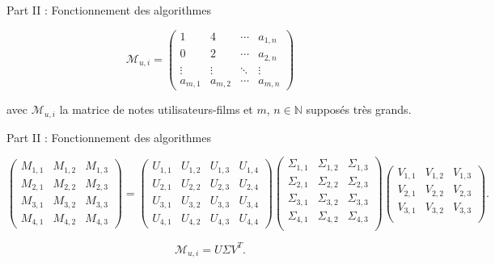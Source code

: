 \begin{frame}{Part II : Fonctionnement des algorithmes}

    $$\mathcal{M}_{u, i} =
        \begin{pmatrix}
            1        & 4        & \cdots{} & a_{1, n} \\
            0        & 2        & \cdots{} & a_{2, n} \\
            \vdots{} & \vdots{} & \ddots{} & \vdots{} \\
            a_{m, 1} & a_{m, 2} & \cdots{} & a_{m, n}
        \end{pmatrix}
    $$

    avec $\mathcal{M}_{u, i}$ la matrice de notes utilisateurs-films et $m$, $n \in \mathbb{N}$ supposés très grands.

\end{frame}

\begin{frame}{Part II : Fonctionnement des algorithmes}

    \begin{equation*}
        \begin{pmatrix}
            M_{1, 1} & M_{1, 2} & M_{1, 3} \\
            M_{2, 1} & M_{2, 2} & M_{2, 3} \\
            M_{3, 1} & M_{3, 2} & M_{3, 3} \\
            M_{4, 1} & M_{4, 2} & M_{4, 3}
        \end{pmatrix}
        =
        \begin{pmatrix}
            U_{1, 1} & U_{1, 2} & U_{1, 3} & U_{1, 4} \\
            U_{2, 1} & U_{2, 2} & U_{2, 3} & U_{2, 4} \\
            U_{3, 1} & U_{3, 2} & U_{3, 3} & U_{3, 4} \\
            U_{4, 1} & U_{4, 2} & U_{4, 3} & U_{4, 4}
        \end{pmatrix}
        \begin{pmatrix}
            \Sigma_{1, 1} & \Sigma_{1, 2} & \Sigma_{1, 3} \\
            \Sigma_{2, 1} & \Sigma_{2, 2} & \Sigma_{2, 3} \\
            \Sigma_{3, 1} & \Sigma_{3, 2} & \Sigma_{3, 3} \\
            \Sigma_{4, 1} & \Sigma_{4, 2} & \Sigma_{4, 3} \\
        \end{pmatrix}
        \begin{pmatrix}
            V_{1, 1} & V_{1, 2} & V_{1, 3} \\
            V_{2, 1} & V_{2, 2} & V_{2, 3} \\
            V_{3, 1} & V_{3, 2} & V_{3, 3} \\
        \end{pmatrix}
        .
    \end{equation*}

    \begin{equation*}
        \mathcal{M}_{u, i} = U \Sigma V^T
        .
    \end{equation*}

\end{frame}
